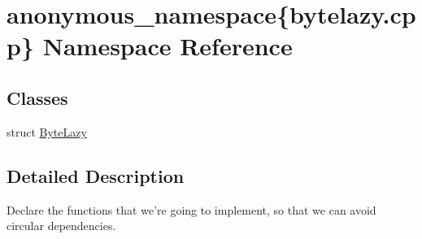 \hypertarget{namespaceanonymous__namespace_02bytelazy_8cpp_03}{\section{anonymous\-\_\-namespace\{bytelazy.\-cpp\} Namespace Reference}
\label{namespaceanonymous__namespace_02bytelazy_8cpp_03}
}
\subsection*{Classes}
\begin{DoxyCompactItemize}
\item 
struct \hyperlink{structanonymous__namespace_02bytelazy_8cpp_03_1_1ByteLazy}{Byte\-Lazy}
\end{DoxyCompactItemize}


\subsection{Detailed Description}
Declare the functions that we're going to implement, so that we can avoid circular dependencies. 
